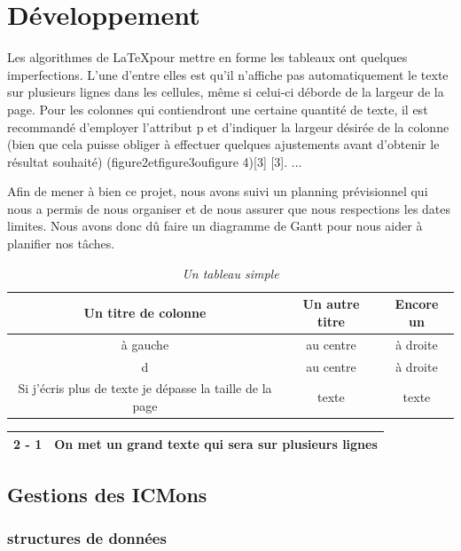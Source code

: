 \documentclass[12pt,a4paper, twoside]{article}
\begin{document}
\section{Développement}
    Les algorithmes de \LaTeX pour mettre en forme les tableaux ont quelques imperfections. L'une d'entre elles est qu'il n'affiche pas automatiquement le texte sur plusieurs lignes dans les cellules, même si celui-ci déborde de la largeur de la page. Pour les colonnes qui contiendront une certaine quantité de texte, il est recommandé d'employer l'attribut p et d'indiquer la largeur désirée de la colonne (bien que cela puisse obliger à effectuer quelques ajustements avant d'obtenir le résultat souhaité) (figure2etfigure3oufigure 4)[3] [3]. ...

    Afin de mener à bien ce projet, nous avons suivi un planning prévisionnel qui nous a permis de nous organiser et de nous assurer que nous respections les dates limites. Nous avons donc dû faire un diagramme de Gantt pour nous aider à planifier nos tâches.
    
\begin{table}[h]
    \centering
    \begin{tabular}{|c|c|c|}
        \hline
        Un titre de colonne & Un autre titre & Encore un \\
        \hline
        à gauche & au centre & à droite \\
        \hline
        d & au centre & à droite \\
        \hline
        Si j'écris plus de texte je dépasse la taille de la page & texte & texte \\
        \hline
    \end{tabular}
    \vspace{1cm}
    \caption{\emph{Un tableau simple}}
    \label{tab:test}
\end{table}


\newpage
\begin{center}
\begin{tabular}{|c|p{8cm}|}
\hline
2 - 1 & On met un grand texte qui sera sur plusieurs lignes \\
\hline
\end{tabular}
\end{center}


\subsection{Gestions des ICMons}
    \subsubsection{structures de données}
\end{document}
